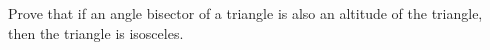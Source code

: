 Prove that if an angle bisector of a triangle is also an altitude of the triangle, then the triangle is isosceles.
